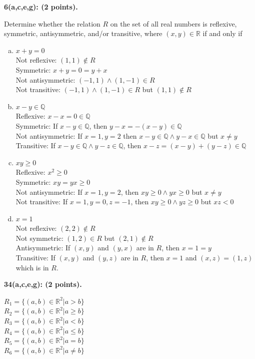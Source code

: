\documentclass[12pt]{article}  %
\begin{document}
\clearpage
\noindent
{\bf 6(a,c,e,g): (2 points).}

\noindent
Determine whether the relation $R$ on the set of all real numbers is reflexive, symmetric, antisymmetric, and/or transitive, where $(x,y)\in\mathbb{R}$ if and only if
\begin{enumerate}[a)]
    \item $x+y=0$\\
    Not reflexive: $(1,1)\not\in R$\\
    Symmetric: $x+y=0=y+x$\\
    Not antisymmetric: $(-1,1)\land(1,-1)\in R$\\
    Not transitive: $(-1,1)\land(1,-1)\in R$ but $(1,1)\not\in R$
    
    \setcounter{enumi}{2}
    \item $x-y\in\mathbb{Q}$\\
    Reflexive: $x-x=0\in\mathbb{Q}$\\
    Symmetric: If $x-y\in\mathbb{Q}$, then $y-x=-(x-y)\in\mathbb{Q}$\\
    Not antisymmetric: If $x=1,y=2$ then $x-y\in\mathbb{Q}\land y-x\in\mathbb{Q}$ but $x\neq y$\\
    Transitive: If $x-y\in\mathbb{Q}\land y-z\in\mathbb{Q}$, then $x-z=(x-y)+(y-z)\in\mathbb{Q}$
    
    \setcounter{enumi}{4}
    \item $xy\geq0$\\
    Reflexive: $x^2\geq0$\\
    Symmetric: $xy=yx\geq0$\\
    Not antisymmetric: If $x=1,y=2$, then $xy\geq0\land yx\geq0$ but $x\neq y$\\
    Not transitive: If $x=1,y=0,z=-1$, then $xy\geq 0\land yz\geq0$ but $xz<0$
    
    \setcounter{enumi}{6}
    \item $x=1$\\
    Not reflexive: $(2,2)\not\in R$\\
    Not symmetric: $(1,2)\in R$ but $(2,1)\not\in R$\\
    Antisymmetric: If $(x,y)$ and $(y,x)$ are in $R$, then $x=1=y$\\
    Transitive: If $(x,y)$ and $(y,z)$ are in $R$, then $x=1$ and $(x,z)=(1,z)$ which is in $R$.
\end{enumerate}

\clearpage
\noindent
{\bf 34(a,c,e,g): (2 points).}

\noindent
$R_1=\{(a,b)\in\mathbb{R}^2|a>b\}$\\
$R_2=\{(a,b)\in\mathbb{R}^2|a\geq b\}$\\
$R_3=\{(a,b)\in\mathbb{R}^2|a<b\}$\\
$R_4=\{(a,b)\in\mathbb{R}^2|a\leq b\}$\\
$R_5=\{(a,b)\in\mathbb{R}^2|a=b\}$\\
$R_6=\{(a,b)\in\mathbb{R}^2|a\neq b\}$
\end{document}
